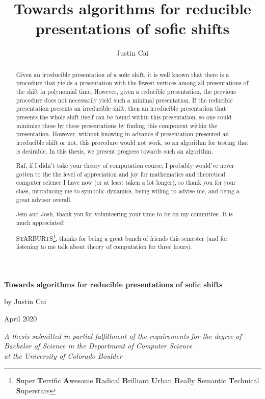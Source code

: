 \documentclass[hidelinks]{report}
\title{Towards algorithms for reducible presentations of sofic shifts}
\author{Justin Cai}
\theoremstyle{definition}
\begin{document}
\begin{titlepage}
    \raggedright
    \vspace*{3cm}
    {\fontsize{30}{100}\selectfont 
    \textbf{Towards algorithms for reducible presentations of sofic shifts}}

    \vspace{.75cm}
    \LARGE by Justin Cai

    \vspace{.75cm}
    \Large April 2020

    \vspace{4cm}
    \normalsize \textit{A thesis submitted in partial fulfillment of
    the requirements for the degree of Bachelor of Science in the Department of Computer Science \\
    at the University of Colorado Boulder  }
\end{titlepage}

\begin{abstract}
    \thispagestyle{plain}
    Given an irreducible presentation of a sofic shift, it is well known 
    that there is a procedure that yields a presentation with the fewest
    vertices among all presentations of the shift in polynomial time. However, 
    given a reducible presentation,
    the previous procedure does not necessarily yield such a minimal presentation.
    If the reducible presentation presents an irreducible shift, 
    then an irreducible presentation that presents the whole shift itself
    can be found within this presentation,
    so one could minimize these by these presentations by finding this 
    component within the presentation. However, without knowing in advance
    if presentation presented an irreducible shift or not, this procedure
    would not work, so an algorithm for testing that is desirable. 
    In this thesis, we present progress towards such an algorithm.
\end{abstract}

\renewcommand{\abstractname}{Acknowledgements}
\begin{abstract}
    \setcounter{page}{2}
    \thispagestyle{plain}
Raf, if I didn't take your theory of computation course, I probably would've 
never gotten to the the level of appreciation and joy for mathematics and 
theoretical computer science I have now (or at least taken a lot longer),
so thank you for your class, introducing me to 
symbolic dynamics, being willing to advise me, and being a great advisor overall.

\vspace{.5cm}\noindent Jem and Josh, thank you for volunteering your time to be on my committee.
It is much appreciated!

\vspace{.5cm}\noindent STARBURTS\footnote{
\textbf{S}uper 
\textbf{T}errific 
\textbf{A}wesome 
\textbf{R}adical 
\textbf{B}rilliant 
\textbf{U}rban 
\textbf{R}eally 
\textbf{S}emantic 
\textbf{T}echnical 
\textbf{S}uperstars}, thanks for being 
a great bunch of friends this semester (and for listening to me talk about theory 
of computation for three hours).
\end{abstract}
\end{document}
